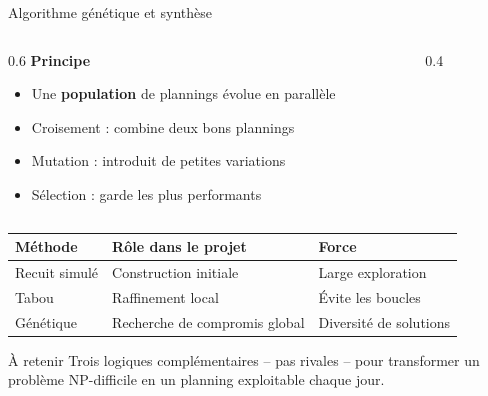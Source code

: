 \begin{frame}{Algorithme génétique et synthèse}
  \begin{columns}[T]
    \begin{column}{0.6\textwidth}
      \small\textbf{Principe}
      \begin{itemize}\itemsep2pt
        \item Une \textbf{population} de plannings évolue en parallèle
        \item Croisement : combine deux bons plannings
        \item Mutation : introduit de petites variations
        \item Sélection : garde les plus performants
      \end{itemize}
    \end{column}
    \begin{column}{0.4\textwidth}
      \centering
    \end{column}
  \end{columns}
  \vspace{2pt}
  \renewcommand{\arraystretch}{0.9}
  \begin{table}
    \centering\scriptsize
    \setlength{\tabcolsep}{4pt}
    \begin{tabular}{lll}
      \toprule
      \textbf{Méthode} & \textbf{Rôle dans le projet} & \textbf{Force} \\
      \midrule
      Recuit simulé & Construction initiale & Large exploration \\
      Tabou & Raffinement local & Évite les boucles \\
      Génétique & Recherche de compromis global & Diversité de solutions \\
      \bottomrule
    \end{tabular}
  \end{table}
  \begin{alertblock}{\footnotesize À retenir}
    \footnotesize Trois logiques complémentaires -- pas rivales -- pour
    transformer un problème NP-difficile en un planning exploitable chaque jour.
  \end{alertblock}
\end{frame}
